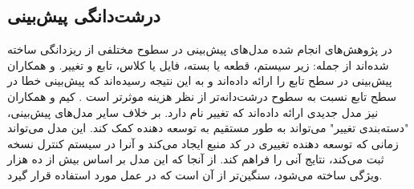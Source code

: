 \subsection{درشت‌دانگی پیش‌بینی }
در پژوهش‌های انجام شده مدل‌های پیش‌بینی در سطوح مختلفی از ریزدانگی ساخته شده‌اند از جمله: زیر سیستم، قطعه یا بسته، فایل یا کلاس، تابع و تغییر.  و همکاران  پیش‌بینی در سطح تابع را ارائه داده‌اند و به این نتیجه رسیده‌اند که پیش‌بینی خطا در سطح تابع نسبت به سطوح درشت‌دانه‌تر از نظر هزینه موثرتر است \cite{hata2012bug}. کیم و همکاران نیز مدل جدیدی ارائه داده‌اند که   تغییر نام دارد. بر خلاف سایر مدل‌های پیش‌بینی، "دسته‌بندی تغییر" می‌تواند به طور مستقیم به توسعه دهنده کمک کند. این مدل می‌تواند زمانی که توسعه دهنده تغییری در کد منبع ایجاد می‌کند و آنرا در سیستم کنترل نسخه ثبت می‌کند، نتایج آنی را فراهم کند.  از آنجا که این مدل بر اساس بیش از ده هزار ویژگی ساخته می‌شود، سنگین‌تر از آن است که در عمل مورد استفاده قرار گیرد\cite{kim2008classifying}. \\


